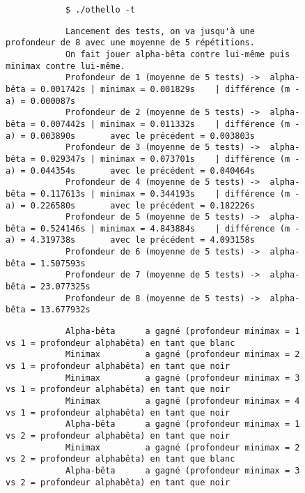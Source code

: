 \documentclass{article}
\begin{document}
\vspace{1cm}
\begin{figure}[h]
    \centering
    \begin{minipage}{1\textwidth}
        \begin{verbatim}
            $ ./othello -t
        \end{verbatim}
        \begin{verbatim}
            Lancement des tests, on va jusqu'à une profondeur de 8 avec une moyenne de 5 répétitions.
            On fait jouer alpha-bêta contre lui-même puis minimax contre lui-même.
            Profondeur de 1 (moyenne de 5 tests) ->  alpha-bêta = 0.001742s | minimax = 0.001829s    | différence (m - a) = 0.000087s
            Profondeur de 2 (moyenne de 5 tests) ->  alpha-bêta = 0.007442s | minimax = 0.011332s    | différence (m - a) = 0.003890s       avec le précédent = 0.003803s
            Profondeur de 3 (moyenne de 5 tests) ->  alpha-bêta = 0.029347s | minimax = 0.073701s    | différence (m - a) = 0.044354s       avec le précédent = 0.040464s
            Profondeur de 4 (moyenne de 5 tests) ->  alpha-bêta = 0.117613s | minimax = 0.344193s    | différence (m - a) = 0.226580s       avec le précédent = 0.182226s
            Profondeur de 5 (moyenne de 5 tests) ->  alpha-bêta = 0.524146s | minimax = 4.843884s    | différence (m - a) = 4.319738s       avec le précédent = 4.093158s
            Profondeur de 6 (moyenne de 5 tests) ->  alpha-bêta = 1.507593s
            Profondeur de 7 (moyenne de 5 tests) ->  alpha-bêta = 23.077325s
            Profondeur de 8 (moyenne de 5 tests) ->  alpha-bêta = 13.677932s
        \end{verbatim}
        \begin{verbatim}
            Alpha-bêta      a gagné (profondeur minimax = 1 vs 1 = profondeur alphabêta) en tant que blanc
            Minimax         a gagné (profondeur minimax = 2 vs 1 = profondeur alphabêta) en tant que noir
            Minimax         a gagné (profondeur minimax = 3 vs 1 = profondeur alphabêta) en tant que noir
            Minimax         a gagné (profondeur minimax = 4 vs 1 = profondeur alphabêta) en tant que noir
            Alpha-bêta      a gagné (profondeur minimax = 1 vs 2 = profondeur alphabêta) en tant que noir
            Minimax         a gagné (profondeur minimax = 2 vs 2 = profondeur alphabêta) en tant que blanc
            Alpha-bêta      a gagné (profondeur minimax = 3 vs 2 = profondeur alphabêta) en tant que noir

\end{verbatim}
\end{minipage}
\end{figure}
\end{document}
